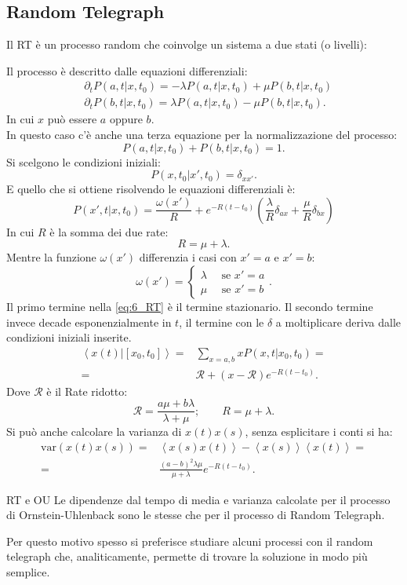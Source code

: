 \subsection{Random Telegraph}%
\label{sub:Random Telegraph}
Il RT è un processo random che coinvolge un sistema a due stati (o livelli):

Il processo è descritto dalle equazioni differenziali:
\[\begin{aligned}
    &\partial_{t}P\left(a,t|x,t_0\right) = -\lambda P\left(a,t|x,t_0\right) + \mu P\left(b,t|x,t_0\right)\\
    &\partial_{t}P\left(b,t|x,t_0\right) = \lambda P\left(a,t|x,t_0\right) - \mu P\left(b,t|x,t_0\right)
.\end{aligned}\]
In cui $x$ può essere $a$ oppure $b$.\\
In questo caso c'è anche una terza equazione per la normalizzazione del processo:
\[
    P\left(a,t|x,t_0\right)+ P\left(b,t|x,t_0\right) = 1
.\] 
Si scelgono le condizioni iniziali:
\[
    P\left(x,t_0|x',t_0\right) = \delta_{xx'}
.\] 
E quello che si ottiene risolvendo le equazioni differenziali è:
\begin{equation}
    P\left(x', t|x,t_0\right) =  \frac{\omega (x') }{R} + e^{-R (t-t_0)}\left(\frac{\lambda}{R}\delta_{ax} + \frac{\mu}{R}\delta_{bx}\right)
    \label{eq:6_RT}
\end{equation}
In cui $R$ è la somma dei due rate:
\[
    R = \mu +\lambda
.\] 
Mentre la funzione $\omega (x')$ differenzia i casi con $x'=a$ e $x'=b$:
\[
    \omega(x') =
    \begin{cases}
        \lambda  \quad \text{ se } x' = a\\
        \mu  \quad \text{ se } x' = b
    \end{cases}
.\]
Il primo termine nella \ref{eq:6_RT} è il termine stazionario. Il secondo termine invece decade esponenzialmente in $t$, il termine con le  $\delta$  a moltiplicare deriva dalle condizioni iniziali inserite.
\[\begin{aligned}
    \left<x(t) | \left[x_0,t_0\right]\right> = & \sum_{x = a,b}^{} xP\left(x,t|x_0,t_0\right) = \\
					      = &\mathcal{R} + \left(x-\mathcal{R}\right)e^{-R(t-t_0)}
.\end{aligned}\]
Dove $\mathcal{R}$ è il Rate ridotto:
\[
\mathcal{R} = \frac{ a\mu + b\lambda}{\lambda + \mu}; \qquad R = \mu + \lambda
.\] 
Si può anche calcolare la varianza di $x(t)x(s)$, senza esplicitare i conti si ha:
\[\begin{aligned}
    \text{var}(x(t) x(s) ) = & \left<x(s) x(t) \right> - \left<x(s)\right>\left<x(t) \right> = \\
			     =& \frac{\left(a-b\right)^2\lambda\mu}{\mu +\lambda}e^{-R(t-t_0) }
.\end{aligned}\]
\begin{bluebox}{RT e OU}
    Le dipendenze dal tempo di media e varianza calcolate per il processo di Ornstein-Uhlenback sono le stesse che per il processo di Random Telegraph.
\end{bluebox}
\noindent
Per questo motivo spesso si preferisce studiare alcuni processi con il random telegraph che, analiticamente, permette di trovare la soluzione in modo più semplice.

